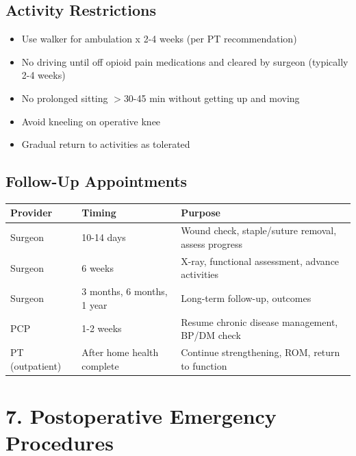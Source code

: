 \documentclass[11pt,letterpaper]{article}
\begin{document}
\subsection*{Activity Restrictions}

\begin{itemize}[leftmargin=*]
    \item Use walker for ambulation x 2-4 weeks (per PT recommendation)
    \item No driving until off opioid pain medications and cleared by surgeon (typically 2-4 weeks)
    \item No prolonged sitting $>$30-45 min without getting up and moving
    \item Avoid kneeling on operative knee
    \item Gradual return to activities as tolerated
\end{itemize}

\subsection*{Follow-Up Appointments}

\begin{tabularx}{\textwidth}{|l|l|X|}
\hline
\textbf{Provider} & \textbf{Timing} & \textbf{Purpose} \\ \hline
Surgeon & 10-14 days & Wound check, staple/suture removal, assess progress \\ \hline
Surgeon & 6 weeks & X-ray, functional assessment, advance activities \\ \hline
Surgeon & 3 months, 6 months, 1 year & Long-term follow-up, outcomes \\ \hline
PCP & 1-2 weeks & Resume chronic disease management, BP/DM check \\ \hline
PT (outpatient) & After home health complete & Continue strengthening, ROM, return to function \\ \hline
\end{tabularx}

\section*{7. Postoperative Emergency Procedures}
\end{document}
